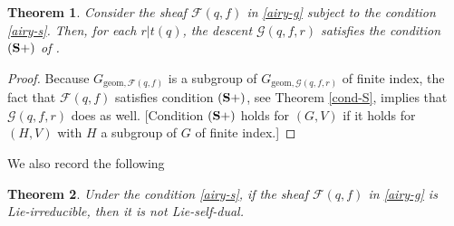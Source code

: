 \documentclass[11pt]{amsart}
\theoremstyle{plain}
\newtheorem{thm}{Theorem}
\theoremstyle{definition}
\numberwithin{thm}{section}
\numberwithin{equation}{thm}
\newcommand{\sF}{{\mathcal F}}
\newcommand{\sG}{{\mathcal G}}
\newcommand{\0}{\emptyset}
\newcommand{\geo}{{\mathrm {geom}}}
\newcommand{\CSP}{\mathrm {({\bf S+})}}
\begin{document}

\begin{thm}\label{tensorindecandprim}
Consider the sheaf $\sF(q,f)$ in \eqref{airy-g} subject to the condition 
\eqref{airy-s}. Then, for each $r|t(q)$, the descent $\sG(q,f,r)$ satisfies the condition
$\CSP$ of \cite[Definition 1.2]{KT5}.
\end{thm}

\begin{proof}
Because $G_{\geo,\sF(q,f)}$ is a subgroup of $G_{\geo,\sG(q,f,r)}$ of finite index, the fact that  $\sF(q,f)$ satisfies condition
$\CSP$, see Theorem \ref{cond-S}, implies that $\sG(q,f,r)$ does as well. [Condition $\CSP$ holds for $(G,V)$ if it holds for $(H,V)$ with $H$ a subgroup of $G$ of finite index.]
\end{proof}

We also record the following

\begin{thm}\label{Lieselfdual}
Under the condition \eqref{airy-s}, if the sheaf $\sF(q,f)$ in \eqref{airy-g} is Lie-irreducible, then it is not Lie-self-dual.
\end{thm}
\end{document}
